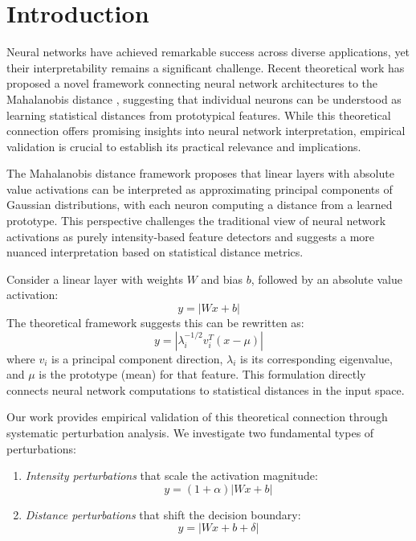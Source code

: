 \section{Introduction}

Neural networks have achieved remarkable success across diverse applications, yet their interpretability remains a significant challenge. Recent theoretical work has proposed a novel framework connecting neural network architectures to the Mahalanobis distance \cite{oursland2024interpreting}, suggesting that individual neurons can be understood as learning statistical distances from prototypical features. While this theoretical connection offers promising insights into neural network interpretation, empirical validation is crucial to establish its practical relevance and implications.

The Mahalanobis distance framework proposes that linear layers with absolute value activations can be interpreted as approximating principal components of Gaussian distributions, with each neuron computing a distance from a learned prototype. This perspective challenges the traditional view of neural network activations as purely intensity-based feature detectors and suggests a more nuanced interpretation based on statistical distance metrics.

Consider a linear layer with weights $W$ and bias $b$, followed by an absolute value activation:
\begin{equation}
    y = |Wx + b|
\end{equation}
The theoretical framework suggests this can be rewritten as:
\begin{equation}
    y = |\lambda^{-1/2}_i v^T_i(x - \mu)|
\end{equation}
where $v_i$ is a principal component direction, $\lambda_i$ is its corresponding eigenvalue, and $\mu$ is the prototype (mean) for that feature. This formulation directly connects neural network computations to statistical distances in the input space.

Our work provides empirical validation of this theoretical connection through systematic perturbation analysis. We investigate two fundamental types of perturbations:
\begin{enumerate}
    \item \textit{Intensity perturbations} that scale the activation magnitude:
        \begin{equation}
            y = (1 + \alpha)|Wx + b|
        \end{equation}
    \item \textit{Distance perturbations} that shift the decision boundary:
        \begin{equation}
            y = |Wx + b + \delta|
        \end{equation}
\end{enumerate}

